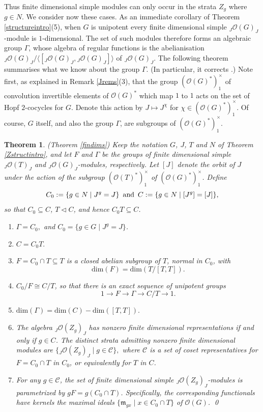 \documentclass{amsart}
\numberwithin{equation}{section}
\newtheorem{theorem}{Theorem}[section]
\theoremstyle{definition}
\begin{document}
Thus finite dimensional simple modules can only occur in the strata $Z_g$ where $g \in N$. We consider now these cases. As an immediate corollary of Theorem \ref{structureintro}(5), when $G$ is unipotent every finite dimensional simple ${}_J\mathcal{O}(G)_J$-module is $1$-dimensional. The set of such modules therefore forms an algebraic group $\Gamma$, whose algebra of regular functions is the abelianisation ${}_J\mathcal{O}(G)_J/\langle [{}_J\mathcal{O}(G)_J, {}_J\mathcal{O}(G)_J]\rangle$ of ${}_J\mathcal{O}(G)_J$. The following theorem summarises what we know about the group $\Gamma$. (In particular, it corrects \cite[Theorem 5.2]{G2}.) Note first, as explained in Remark \ref{Jrems}(3), that the group $(\mathcal{O}(G)^*)^{\times}_1$ of convolution invertible elements of $\mathcal{O}(G)^*$ which map $1$ to $1$ acts on the set of Hopf $2$-cocycles for $G$. Denote this action by $J \mapsto J^{\chi}$ for $\chi \in (\mathcal{O}(G)^*)^{\times}_1$. Of course, $G$ itself, and also the group $\Gamma$, are subgroups of  $(\mathcal{O}(G)^*)^{\times}_1$.

\begin{theorem}\label{findimintro}{\rm (Theorem \ref{findims})} 
Keep the notation $G$, $J$, $T$ and $N$ of Theorem \ref{Zstructintro}, and let $F$ and $\Gamma$ be the groups of finite dimensional simple ${}_J\mathcal{O}(T)_J$ and ${}_J\mathcal{O}(G)_J$-modules, respectively. Let $[J]$ denote the orbit of $J$ under the action of the subgroup $(\mathcal{O}(T)^*)^{\times}_1$ of $(\mathcal{O}(G)^*)^{\times}_1$. Define  $$C_0 := \{ g \in N\mid J^g = J \}\,\,\, {\rm and} \,\,\,C := \{ g \in N \mid [J^g] = [J]\},$$ so that $C_0 \subseteq C$, $T \triangleleft C$, and hence $C_0 T \subseteq C$.
\begin{enumerate}
\item $\Gamma = C_0,$ and $C_0 = \{g \in G \mid J^g = J\}$.
\item $C = C_0T.$
\item $F=C_0 \cap T\subseteq T$ is a closed abelian subgroup of $T$, normal in $C_0$, with 
 $$ \mathrm{dim}(F)= \mathrm{dim}(T/[T,T]).$$
\item $C_0/F \cong C/T$, so that there is an exact sequence of unipotent groups
$$ 1 \rightarrow F \rightarrow \Gamma \rightarrow C/T \rightarrow 1.$$
\item $\mathrm{dim}(\Gamma)=\mathrm{dim}(C) - \mathrm{dim}([T,T]).$
\item The algebra ${}_J\mathcal{O}(Z_g)_J$ has nonzero finite dimensional representations if and only if $g\in C$. The distinct strata admitting nonzero finite dimensional modules are $\{{}_J\mathcal{O}(Z_g)_J \mid g \in \mathcal{C}\},$ where $\mathcal{C}$ is a set of coset representatives for $F=C_0 \cap T$ in $C_0$, or equivalently for $T$ in $C$.
\item For any $g \in \mathcal{C}$, the set of finite dimensional simple ${}_J\mathcal{O}(Z_g)_J$-modules is  
parametrized by $gF=g(C_0 \cap T)$. Specifically, the corresponding functionals have kernels the maximal 
ideals $\{\mathfrak{m}_{gx} \mid x\in C_0 \cap T \}$ of $\mathcal{O}(G)$. \qed
\end{enumerate}
\end{theorem}
\end{document}
